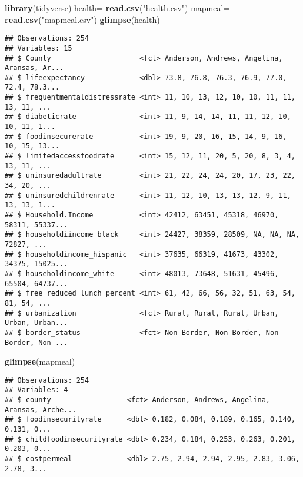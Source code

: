 \documentclass[]{article}
\newenvironment{Shaded}{\begin{snugshade}}{\end{snugshade}}
\newcommand{\KeywordTok}[1]{\textcolor[rgb]{0.13,0.29,0.53}{\textbf{#1}}}
\newcommand{\NormalTok}[1]{#1}
\newcommand{\StringTok}[1]{\textcolor[rgb]{0.31,0.60,0.02}{#1}}
\begin{document}
\begin{Shaded}
\begin{Highlighting}[]
\KeywordTok{library}\NormalTok{(tidyverse)}
\NormalTok{health=}\StringTok{ }\KeywordTok{read.csv}\NormalTok{(}\StringTok{"health.csv"}\NormalTok{)}
\NormalTok{mapmeal=}\StringTok{ }\KeywordTok{read.csv}\NormalTok{(}\StringTok{"mapmeal.csv"}\NormalTok{)}
\KeywordTok{glimpse}\NormalTok{(health)}
\end{Highlighting}
\end{Shaded}

\begin{verbatim}
## Observations: 254
## Variables: 15
## $ County                     <fct> Anderson, Andrews, Angelina, Aransas, Ar...
## $ lifeexpectancy             <dbl> 73.8, 76.8, 76.3, 76.9, 77.0, 72.4, 78.3...
## $ frequentmentaldistressrate <int> 11, 10, 13, 12, 10, 10, 11, 11, 13, 11, ...
## $ diabeticrate               <int> 11, 9, 14, 14, 11, 11, 12, 10, 10, 11, 1...
## $ foodinsecurerate           <int> 19, 9, 20, 16, 15, 14, 9, 16, 10, 15, 13...
## $ limitedaccessfoodrate      <int> 15, 12, 11, 20, 5, 20, 8, 3, 4, 13, 11, ...
## $ uninsuredadultrate         <int> 21, 22, 24, 24, 20, 17, 23, 22, 34, 20, ...
## $ uninsuredchildrenrate      <int> 11, 12, 10, 13, 13, 12, 9, 11, 13, 13, 1...
## $ Household.Income           <int> 42412, 63451, 45318, 46970, 58311, 55337...
## $ householdiincome_black     <int> 24427, 38359, 28509, NA, NA, NA, 72827, ...
## $ householdincome_hispanic   <int> 37635, 66319, 41673, 43302, 34375, 15025...
## $ householdincome_white      <int> 48013, 73648, 51631, 45496, 65504, 64737...
## $ free_reduced_lunch_percent <int> 61, 42, 66, 56, 32, 51, 63, 54, 81, 54, ...
## $ urbanization               <fct> Rural, Rural, Rural, Urban, Urban, Urban...
## $ border_status              <fct> Non-Border, Non-Border, Non-Border, Non-...
\end{verbatim}

\begin{Shaded}
\begin{Highlighting}[]
\KeywordTok{glimpse}\NormalTok{(mapmeal)}
\end{Highlighting}
\end{Shaded}

\begin{verbatim}
## Observations: 254
## Variables: 4
## $ county                  <fct> Anderson, Andrews, Angelina, Aransas, Arche...
## $ foodinsecurityrate      <dbl> 0.182, 0.084, 0.189, 0.165, 0.140, 0.131, 0...
## $ childfoodinsecurityrate <dbl> 0.234, 0.184, 0.253, 0.263, 0.201, 0.203, 0...
## $ costpermeal             <dbl> 2.75, 2.94, 2.94, 2.95, 2.83, 3.06, 2.78, 3...
\end{verbatim}
\end{document}
